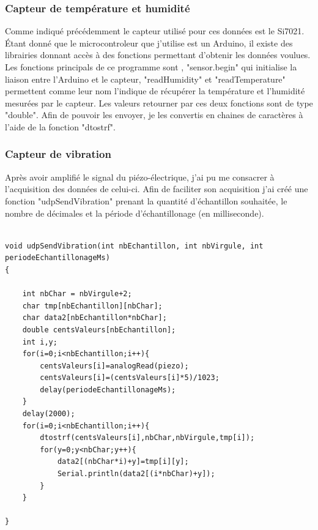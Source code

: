 \documentclass[11pt,french,a4paper]{article}
\begin{document}
\subsubsection{Capteur de température et humidité}
Comme indiqué précédemment le capteur utilisé pour ces données est le Si7021. Étant donné que le microcontroleur que j'utilise est un Arduino, il existe des librairies donnant accès à des fonctions permettant d'obtenir les données voulues.
Les fonctions principals de ce programme sont , "sensor.begin" qui initialise la liaison entre l'Arduino et le capteur, "readHumidity" et "readTemperature" permettent comme leur nom l'indique de récupérer la température et l'humidité mesurées par le capteur. Les valeurs retourner par ces deux fonctions sont de type "double". Afin de pouvoir les envoyer, je les convertis en chaines de caractères à l'aide de la fonction "dtostrf".

\subsubsection{Capteur de vibration}
Après avoir amplifié le signal du piézo-électrique, j'ai pu me consacrer à l'acquisition des données de celui-ci. Afin de faciliter son acquisition j'ai créé une fonction "udpSendVibration" prenant la quantité d'échantillon souhaitée, le nombre de décimales et la période d'échantillonage (en milliseconde).

\begin{scriptsize}
\begin{lstlisting}

void udpSendVibration(int nbEchantillon, int nbVirgule, int periodeEchantillonageMs)
{

	int nbChar = nbVirgule+2;
	char tmp[nbEchantillon][nbChar];
	char data2[nbEchantillon*nbChar];
	double centsValeurs[nbEchantillon];
	int i,y;
	for(i=0;i<nbEchantillon;i++){
		centsValeurs[i]=analogRead(piezo);
		centsValeurs[i]=(centsValeurs[i]*5)/1023;
		delay(periodeEchantillonageMs);
	}
	delay(2000);
	for(i=0;i<nbEchantillon;i++){
		dtostrf(centsValeurs[i],nbChar,nbVirgule,tmp[i]);
		for(y=0;y<nbChar;y++){
			data2[(nbChar*i)+y]=tmp[i][y];
			Serial.println(data2[(i*nbChar)+y]);	
		}	
	}

}
\end{lstlisting}
\end{scriptsize} 
\end{document}
